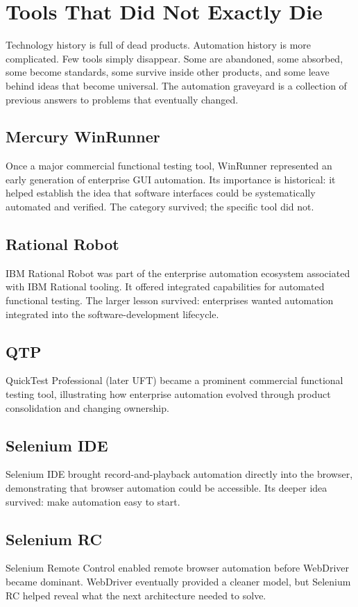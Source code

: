 \documentclass[11pt,twoside]{book}
\begin{document}
\section*{Tools That Did Not Exactly Die}

Technology history is full of dead products. Automation history is more complicated.
Few tools simply disappear. Some are abandoned, some absorbed, some become standards, some survive inside other products, and some leave behind ideas that become universal.
The automation graveyard is a collection of previous answers to problems that eventually changed.

\subsection*{Mercury WinRunner}
Once a major commercial functional testing tool, WinRunner represented an early generation of enterprise GUI automation. Its importance is historical: it helped establish the idea that software interfaces could be systematically automated and verified. The category survived; the specific tool did not.

\subsection*{Rational Robot}
IBM Rational Robot was part of the enterprise automation ecosystem associated with IBM Rational tooling. It offered integrated capabilities for automated functional testing. The larger lesson survived: enterprises wanted automation integrated into the software-development lifecycle.

\subsection*{QTP}
QuickTest Professional (later UFT) became a prominent commercial functional testing tool, illustrating how enterprise automation evolved through product consolidation and changing ownership.

\subsection*{Selenium IDE}
Selenium IDE brought record-and-playback automation directly into the browser, demonstrating that browser automation could be accessible. Its deeper idea survived: make automation easy to start.

\subsection*{Selenium RC}
Selenium Remote Control enabled remote browser automation before WebDriver became dominant. WebDriver eventually provided a cleaner model, but Selenium RC helped reveal what the next architecture needed to solve.
\end{document}
